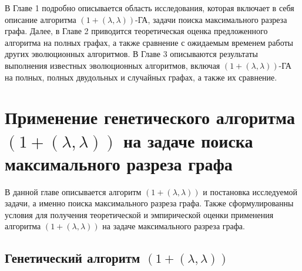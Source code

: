 \documentclass[times]{itmo-student-thesis}
\newcommand{\alglambda}{${(1 + (\lambda , \lambda))}$\xspace}
\newcommand{\alglambdaf}{${(1 + (\lambda , \lambda))}$-ГА\xspace}
\begin{document}

\tableofcontents

\startprefacepage
В Главе 1 подробно описывается область исследования, которая включает в себя описание алгоритма \alglambdaf, задачи поиска максимального разреза графа.
Далее, в Главе 2 приводится теоретическая оценка предложенного алгоритма на полных графах, а также сравнение с ожидаемым временем работы других эволюционных алгоритмов.
В Главе 3 описываются результаты выполнения известных эволюционных алгоритмов, включая \alglambdaf на полных, полных двудольных и случайных графах, а также их сравнение.

\chapter{Применение генетического алгоритма \alglambda на задаче поиска максимального разреза графа}

\startrelatedwork
В данной главе описывается алгоритм \alglambda и постановка исследуемой задачи, а именно поиска максимального разреза графа.
Также сформулированны условия для получения теоретической и эмпирической оценки применения алгоритма \alglambda на задаче максимального разреза графа.
\finishrelatedwork

\section{Генетический алгоритм \alglambda}
\end{document}
